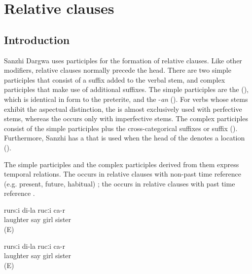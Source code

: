 \chapter{Relative clauses}
\label{cpt:Relative clauses}



\section{Introduction}
\label{sec:relativeclausesintro}

Sanzhi Dargwa uses participles for the formation of relative clauses. Like other modifiers, relative clauses normally precede the head. There are two simple participles that consist of a suffix added to the verbal stem, and complex participles that make use of additional suffixes. The simple participles are the  (), which is identical in form to the preterite, and the  -\textit{an} (). For verbs whose stems exhibit the aspectual distinction, the  is almost exclusively used with perfective stems, whereas the  occurs only with imperfective stems. The complex participles consist of the simple participles plus the cross-categorical suffixes  or suffix  (). Furthermore, Sanzhi has a  that is used when the head of the  denotes a location ().

The simple participles and the complex participles derived from them express temporal relations. The  occurs in relative clauses with non-past time reference (e.g. present, future, habitual) ; the  occurs in relative clauses with past time reference .

\begin{exe}
	\ex	\label{ex:The girl who is laughing is my sister}
	\gll	[ħaˁħaˁ	r-ik'ʷ-an]	rursːi	di-la	rucːi	ca-r\\
		laughter	say	girl		sister	\\
	\glt	{} (E)
	
	\ex	\label{ex:The girl who was laughing is my sister}
	\gll	[ħaˁħaˁ	r-ik'-ub]	rursːi	di-la	rucːi	ca-r\\
		laughter	say	girl		sister	\\
	\glt	{} (E)

\end{exe}

